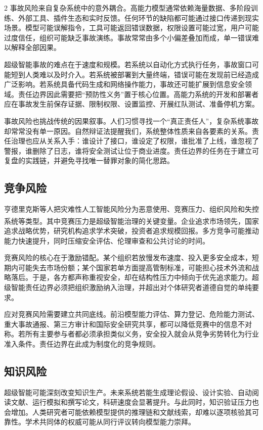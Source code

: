 \documentclass[a4paper,UTF8,zihao=5,twoside]{ctexart}
\newcommand{\upcite}[1]{\textsuperscript{\cite{#1}}}
\begin{document}
\begin{multicols}{2}
事故风险来自复杂系统中的意外耦合。高能力模型通常依赖海量数据、多阶段训练、外部工具、插件生态和实时反馈。任何环节的缺陷都可能通过接口传递到现实场景。模型可能误解指令，工具可能返回错误数据，权限设置可能过宽，用户可能过度信任，组织可能缺乏事故演练。事故常常由多个小偏差叠加而成，单一错误难以解释全部因果。

超级智能事故的难点在于速度和规模。若系统以自动化方式执行任务，事故窗口可能短到人类难以及时介入。若系统被部署到大量终端，错误可能在发现前已经造成广泛影响。若系统具备代码生成和网络操作能力，事故还可能扩展到信息安全领域。责任边界因此需要把“预防性义务”置于核心位置。高能力系统的开发和部署者应在事故发生前保存证据、限制权限、设置监控、开展红队测试、准备停机方案。

事故风险也挑战传统的因果叙事。人们习惯寻找一个“真正责任人”，复杂系统事故却常常没有单一原因。自然辩证法提醒我们，系统整体性质来自各要素的关系。责任治理也应从关系入手：谁设计了接口，谁设定了权限，谁批准了上线，谁忽视了警报，谁删除了日志，谁将安全测试让位于商业进度。责任边界的任务在于建立可复盘的实践链，并避免寻找唯一替罪对象的简化思路。

\subsection{竞争风险}

亨德里克斯等人把灾难性人工智能风险分为恶意使用、竞赛压力、组织风险和失控系统等类型\upcite{hendrycks2023}。其中竞赛压力是超级智能治理的关键变量。企业追求市场领先，国家追求战略优势，研究机构追求学术突破，投资者追求规模回报。多方竞争可能推动能力快速提升，同时压缩安全评估、伦理审查和公共讨论的时间。

竞赛风险的核心在于激励错配。某个组织若放慢发布速度、投入更多安全成本，短期内可能失去市场份额；某个国家若单方面提高管制标准，可能担心技术外流和战略落后。于是，各方都声称重视安全，却在结构性压力中倾向于优先追求能力。超级智能责任边界必须把组织激励纳入治理，并超出对个体研究者道德自觉的单纯要求。

应对竞赛风险需要建立共同底线。前沿模型能力评估、算力登记、危险能力测试、重大事故通报、第三方审计和国际安全研究共享，都可以降低竞赛中的信息不对称。若所有主要参与者都必须承担类似义务，安全投入就会从竞争劣势转化为行业准入条件。责任边界在此成为制度化的竞争规则。

\subsection{知识风险}

超级智能可能深刻改变知识生产。未来系统若能生成理论假设、设计实验、自动阅读文献、运行模拟和撰写论文，科研速度会显著提升。与此同时，知识验证压力也会增加。人类研究者可能依赖模型提供的推理链和文献线索，却难以逐项核验其可靠性。学术共同体的权威可能从同行评议转向模型能力崇拜。


\end{multicols}
\end{document}
